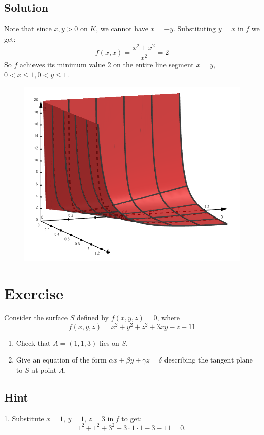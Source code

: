 \documentclass[a4paper,10pt]{article}
\begin{document}
\subsection{Solution}
Note that since $x, y > 0$ on $K$, we cannot have $x = -y$. Substituting $y=x$ in $f$ we get:
\[
    f(x,x) = \frac{x^2 + x^2}{x^2} = 2
\]
So $f$ achieves its minimum value 2 on the entire line segment $x=y$, $0 < x \leq 1, 0 < y \leq 1$.

\begin{figure}[!ht]
    \centering
    \includegraphics[scale=0.5]{ex_4.png}
\end{figure}

\clearpage

\section{Exercise}
Consider the surface $S$ defined by $f(x,y,z)=0$, where
\[
    f(x,y,z) = x^2 + y^2 + z^2 + 3xy - z - 11
\]
\begin{enumerate}
    \item Check that $A = (1,1,3)$ lies on $S$.
    \item Give an equation of the form $\alpha x+\beta y+\gamma z=\delta$ describing the tangent plane to $S$ at point $A$.
\end{enumerate}

\subsection{Hint}
1. Substitute $x=1$, $y=1$, $z=3$ in $f$ to get:
\[
    1^2 + 1^2 + 3^2 + 3\cdot 1\cdot 1 - 3 - 11 = 0.
\]
\end{document}
